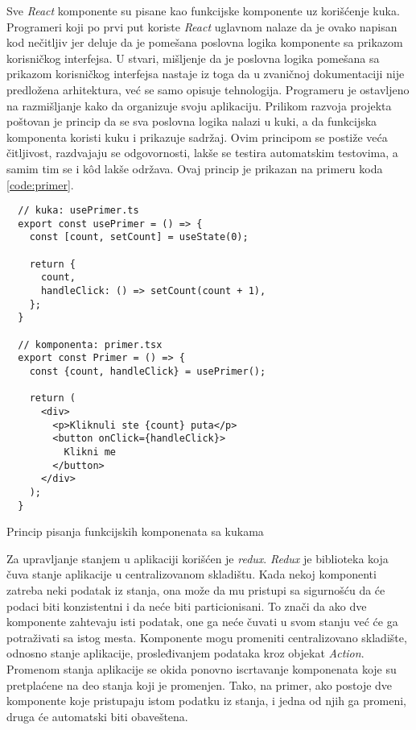 Sve \textit{React} komponente su pisane kao funkcijske komponente uz korišćenje kuka.
Programeri koji po prvi put koriste \textit{React} uglavnom nalaze da je 
ovako napisan kod nečitljiv jer deluje da je pomešana poslovna logika komponente 
sa prikazom korisničkog interfejsa. U stvari, mišljenje da je poslovna logika 
pomešana sa prikazom korisničkog interfejsa nastaje iz toga da u zvaničnoj 
dokumentaciji nije predložena arhitektura, već se samo opisuje tehnologija.
Programeru je ostavljeno na razmišljanje kako da organizuje svoju aplikaciju.
Prilikom razvoja projekta poštovan je princip da se sva poslovna logika 
nalazi u kuki, a da funkcijska komponenta koristi kuku i prikazuje sadržaj. 
Ovim principom se postiže veća čitljivost, razdvajaju se odgovornosti, lakše se testira 
automatskim testovima, a samim tim se i kôd lakše održava. 
Ovaj princip je prikazan na primeru koda \ref{code:primer}.

\begin{listing}[h]
  \centering
  \begin{verbatim}
  // kuka: usePrimer.ts 
  export const usePrimer = () => {
    const [count, setCount] = useState(0);

    return {
      count,
      handleClick: () => setCount(count + 1),
    };
  }

  // komponenta: primer.tsx 
  export const Primer = () => {
    const {count, handleClick} = usePrimer();

    return (
      <div>
        <p>Kliknuli ste {count} puta</p>
        <button onClick={handleClick}>
          Klikni me
        </button>
      </div>
    );
  }
  \end{verbatim}
\caption{Princip pisanja funkcijskih komponenata sa kukama}
\label{code:primer}
\end{listing}

Za upravljanje stanjem u aplikaciji korišćen je \textit{redux}. \textit{Redux} je biblioteka
koja čuva stanje aplikacije u centralizovanom skladištu. Kada nekoj komponenti zatreba 
neki podatak iz stanja, ona može da mu pristupi sa sigurnošću da će podaci biti konzistentni 
i da neće biti particionisani. To znači da ako dve komponente zahtevaju isti podatak, 
one ga neće čuvati u svom stanju već će ga potraživati sa istog mesta. Komponente mogu promeniti 
centralizovano skladište, odnosno stanje aplikacije, prosleđivanjem podataka kroz objekat \textit{Action}.
Promenom stanja aplikacije se okida ponovno iscrtavanje komponenata koje su pretplaćene na 
deo stanja koji je promenjen. Tako, na primer, ako postoje dve komponente koje pristupaju
istom podatku iz stanja, i jedna od njih ga promeni, druga će automatski biti obaveštena.


